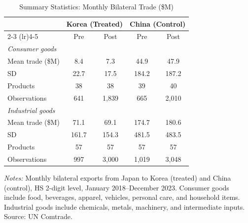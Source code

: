 \begin{table}[htbp]
\centering
\caption{Summary Statistics: Monthly Bilateral Trade (\$M)}
\label{tab:summary}
\begin{threeparttable}
\begin{tabular}{lcccc}
\toprule
 & \multicolumn{2}{c}{Korea (Treated)} & \multicolumn{2}{c}{China (Control)} \\
\cmidrule(lr){2-3} \cmidrule(lr){4-5}
 & Pre & Post & Pre & Post \\
\midrule
\textit{Consumer goods} & & & & \\
\quad Mean trade (\$M) & 8.4 & 7.3 & 44.9 & 47.9 \\
\quad SD & 22.7 & 17.5 & 184.2 & 187.2 \\
\quad Products & 38 & 38 & 39 & 40 \\
\quad Observations & 641 & 1,839 & 665 & 2,010 \\
[6pt]
\textit{Industrial goods} & & & & \\
\quad Mean trade (\$M) & 71.1 & 69.1 & 174.7 & 180.6 \\
\quad SD & 161.7 & 154.3 & 481.5 & 483.5 \\
\quad Products & 57 & 57 & 57 & 57 \\
\quad Observations & 997 & 3,000 & 1,019 & 3,048 \\
\bottomrule
\end{tabular}
\begin{tablenotes}[flushleft]\footnotesize
\item \textit{Notes:} Monthly bilateral exports from Japan to Korea (treated) and China (control), HS 2-digit level, January 2018--December 2023. Consumer goods include food, beverages, apparel, vehicles, personal care, and household items. Industrial goods include chemicals, metals, machinery, and intermediate inputs. Source: UN Comtrade.
\end{tablenotes}
\end{threeparttable}
\end{table}
